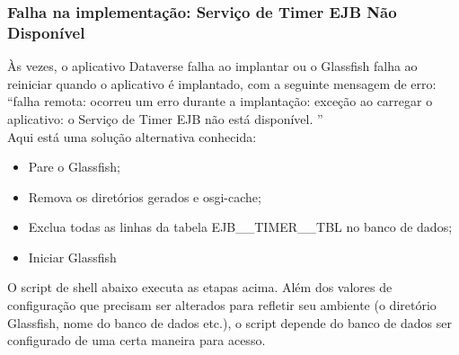 \documentclass[12pt,hidelinks]{article}
\begin{document}
\subsubsection{Falha na implementação: Serviço de Timer EJB Não Disponível}

\qquad Às vezes, o aplicativo Dataverse falha ao implantar ou o Glassfish falha ao reiniciar quando o aplicativo é implantado, com a seguinte mensagem de erro:\\

“falha remota: ocorreu um erro durante a implantação: exceção ao carregar o aplicativo: o Serviço de Timer EJB não está disponível. ”\\

Aqui está uma solução alternativa conhecida:

\begin{itemize}

    \item Pare o Glassfish;
    \item Remova os diretórios gerados e osgi-cache;
    \item Exclua todas as linhas da tabela EJB\_\_TIMER\_\_TBL no banco de dados;
    \item Iniciar Glassfish

\end{itemize}

O script de shell abaixo executa as etapas acima. Além dos valores de configuração que precisam ser alterados para refletir seu ambiente (o diretório Glassfish, nome do banco de dados etc.), o script depende do banco de dados ser configurado de uma certa maneira para acesso.
\end{document}
